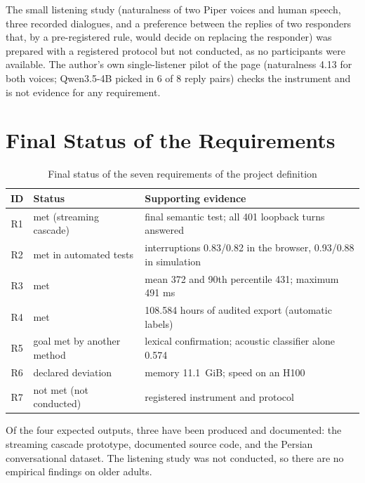 
The small listening study (naturalness of two Piper voices and human speech,
three recorded dialogues, and a preference between the replies of two responders
that, by a pre-registered rule, would decide on replacing the responder) was prepared
with a registered protocol but not conducted, as no participants were available. The
author's own single-listener pilot of the page (naturalness 4.13 for both voices; Qwen3.5-4B
picked in 6 of 8 reply pairs) checks the instrument and is not evidence for any requirement.

\section{Final Status of the Requirements}
\label{sec:res-requirements}

\begin{table}[ht]
\centering
\caption{Final status of the seven requirements of the project definition}
\label{tab:req-status}
\small
\begin{tabular}{cL{4.2cm}L{6.0cm}}
\toprule
\textbf{ID} & \textbf{Status} & \textbf{Supporting evidence} \\
\midrule
R1 & met (streaming cascade) & final semantic test; all 401 loopback turns answered \\
R2 & met in automated tests & interruptions 0.83/0.82 in the browser, 0.93/0.88 in simulation \\
R3 & met & mean 372 and 90th percentile 431; maximum 491 ms \\
R4 & met & 108.584 hours of audited export (automatic labels) \\
R5 & goal met by another method & lexical confirmation; acoustic classifier alone 0.574 \\
R6 & declared deviation & memory 11.1~GiB; speed on an H100 \\
R7 & not met (not conducted) & registered instrument and protocol \\
\bottomrule
\end{tabular}
\end{table}


Of the four expected outputs, three have been produced and documented: the
streaming cascade prototype, documented source code, and the Persian
conversational dataset. The listening study was not conducted, so there are no
empirical findings on older adults.

